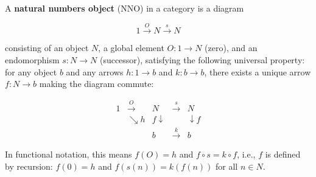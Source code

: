 A \textbf{natural numbers object} (NNO) in a category is a diagram

$$1 \xrightarrow{O} N \xrightarrow{s} N$$

consisting of an object $N$, a global element $O : 1 \to N$ (zero), and an endomorphism $s : N \to N$ (successor), satisfying the following universal property: for any object $b$ and any arrows $h : 1 \to b$ and $k : b \to b$, there exists a unique arrow $f : N \to b$ making the diagram commute:

$$\begin{array}{ccccc}
1 & \xrightarrow{O} & N & \xrightarrow{s} & N \\
& \searrow{\scriptstyle h} & {\scriptstyle f}\downarrow & & \downarrow{\scriptstyle f} \\
& & b & \xrightarrow{k} & b
\end{array}$$

In functional notation, this means $f(O) = h$ and $f \circ s = k \circ f$, i.e., $f$ is defined by recursion: $f(0) = h$ and $f(s(n)) = k(f(n))$ for all $n \in N$.
